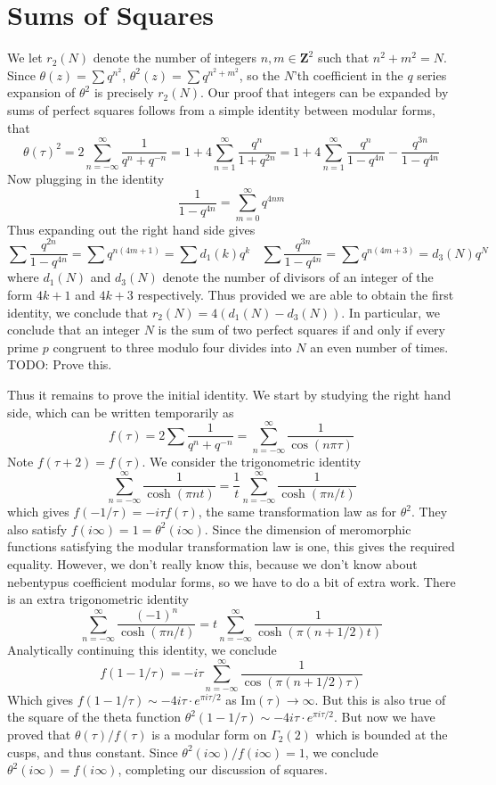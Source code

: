 \documentclass{article}
\theoremstyle{plain}
\theoremstyle{remark}
\theoremstyle{definition}
\begin{document}
\section{Sums of Squares}

We let $r_2(N)$ denote the number of integers $n,m \in \mathbf{Z}^2$ such that $n^2 + m^2 = N$. Since $\theta(z) = \sum q^{n^2}$, $\theta^2(z) = \sum q^{n^2 + m^2}$, so the $N$'th coefficient in the $q$ series expansion of $\theta^2$ is precisely $r_2(N)$. Our proof that integers can be expanded by sums of perfect squares follows from a simple identity between modular forms, that
%
\[ \theta(\tau)^2 = 2 \sum_{n = -\infty}^\infty \frac{1}{q^n + q^{-n}} = 1 + 4 \sum_{n = 1}^\infty \frac{q^{n}}{1 + q^{2n}} = 1 + 4 \sum_{n = 1}^\infty \frac{q^n}{1 - q^{4n}} - \frac{q^{3n}}{1 - q^{4n}} \]
%
Now plugging in the identity
%
\[ \frac{1}{1 - q^{4n}} = \sum_{m = 0}^\infty q^{4nm} \]
%
Thus expanding out the right hand side gives
%
\[ \sum \frac{q^{2n}}{1 - q^{4n}} = \sum q^{n(4m + 1)} = \sum d_1(k) q^k\ \ \ \ \sum \frac{q^{3n}}{1 - q^{4n}} = \sum q^{n(4m + 3)} = d_3(N) q^N \]
%
where $d_1(N)$ and $d_3(N)$ denote the number of divisors of an integer of the form $4k + 1$ and $4k + 3$ respectively. Thus provided we are able to obtain the first identity, we conclude that $r_2(N) = 4(d_1(N) - d_3(N))$. In particular, we conclude that an integer $N$ is the sum of two perfect squares if and only if every prime $p$ congruent to three modulo four divides into $N$ an even number of times. TODO: Prove this.

Thus it remains to prove the initial identity. We start by studying the right hand side, which can be written temporarily as
%
\[ f(\tau) = 2 \sum \frac{1}{q^n + q^{-n}} = \sum_{n = -\infty}^\infty \frac{1}{\cos(n \pi \tau)} \]
%
Note $f(\tau + 2) = f(\tau)$. We consider the trigonometric identity
%
\[ \sum_{n = -\infty}^\infty \frac{1}{\cosh(\pi n t)} = \frac{1}{t} \sum_{n = -\infty}^\infty \frac{1}{\cosh(\pi n/t)} \]
%
which gives $f(-1/\tau) = -i \tau f(\tau)$, the same transformation law as for $\theta^2$. They also satisfy $f(i \infty) = 1 = \theta^2(i \infty)$. Since the dimension of meromorphic functions satisfying the modular transformation law is one, this gives the required equality. However, we don't really know this, because we don't know about nebentypus coefficient modular forms, so we have to do a bit of extra work. There is an extra trigonometric identity
%
\[ \sum_{n = -\infty}^\infty \frac{(-1)^n}{\cosh(\pi n / t)} = t \sum_{n = -\infty}^\infty \frac{1}{\cosh(\pi(n + 1/2)t)} \]
%
Analytically continuing this identity, we conclude
%
\[ f(1 - 1/\tau) = -i \tau \sum_{n = -\infty}^\infty \frac{1}{\cos(\pi(n + 1/2)\tau)} \]
%
Which gives $f(1 - 1/\tau) \sim -4 i \tau \cdot e^{\pi i \tau/2}$ as $\text{Im}(\tau) \to \infty$. But this is also true of the square of the theta function $\theta^2(1 - 1/\tau) \sim -4i \tau \cdot e^{\pi i \tau/2}$. But now we have proved that $\theta(\tau) / f(\tau)$ is a modular form on $\Gamma_2(2)$ which is bounded at the cusps, and thus constant. Since $\theta^2(i\infty)/f(i\infty) = 1$, we conclude $\theta^2(i\infty) = f(i \infty)$, completing our discussion of squares.
\end{document}

